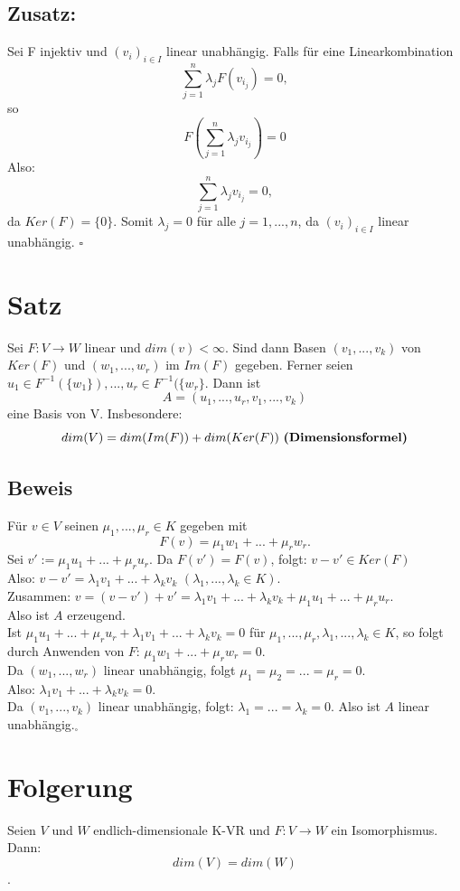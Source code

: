 \documentclass{scrbook}
\begin{document}
\subsection*{Zusatz:} Sei F injektiv und $(v_i)_{i\in I}$ linear unabhängig. Falls für eine Linearkombination \[\sum^n_{j=1} \lambda_j F(v_{i_j})=0,\] so \[F(\sum^n_{j=1} \lambda_j v_{i_j}) =0\] Also: \[\sum^n_{j=1}\lambda_j v_{i_j} = 0,\] da $Ker(F) = \{0\}$. Somit $\lambda_j=0$ für alle $j=1,...,n$, da $(v_i)_{i\in I}$ linear unabhängig. $\square$
\section{Satz} Sei $F:V\rightarrow W$ linear und $dim(v) < \infty$. Sind dann Basen $(v_1,...,v_k)$ von $Ker(F)$ und $(w_1,...,w_r)$ im $Im(F)$ gegeben. Ferner seien $u_1 \in F^{-1}(\{w_1\}),...,u_r\in F^{-1}(\{w_r\}$. Dann ist\[A = (u_1,...,u_r,v_1,...,v_k)\] eine Basis von V. Insbesondere:\[ dim(V) = dim(Im(F))+dim(Ker(F)) \text{ \textbf{(Dimensionsformel)}}\]
\subsection*{Beweis} Für $v \in V$ seinen $\mu_1,...,\mu_r\in K$ gegeben mit\[F(v)=\mu_1 w_1+...+ \mu_r w_r.\] Sei $v' := \mu_1 u_1 +...+ \mu_r u_r$. Da $F(v') = F(v)$, folgt: $v-v' \in Ker(F)$\\Also: $v-v' = \lambda_1v_1+...+\lambda_kv_k $ $(\lambda_1,...,\lambda_k \in K)$.\\Zusammen: $v=(v-v')+v' = \lambda_1v_1+...+\lambda_kv_k+\mu_1u_1+...+\mu_ru_r$.\\Also ist $A$ erzeugend.\\
Ist $\mu_1u_1+...+\mu_ru_r+\lambda_1v_1+...+\lambda_kv_k = 0$ für $\mu_1,...,\mu_r,\lambda_1,...,\lambda_k \in K$, so folgt durch Anwenden von $F$: $\mu_1w_1+...+\mu_rw_r =0$.\\ Da $(w_1,...,w_r)$ linear unabhängig, folgt $\mu_1=\mu_2=...=\mu_r = 0$.\\Also: $\lambda_1v_1+...+\lambda_kv_k=0$.\\Da $(v_1,...,v_k)$ linear unabhängig, folgt: $\lambda_1=...=\lambda_k=0$. Also ist $A$ linear unabhängig.$_\square$
\section{Folgerung}
Seien $V$ und $W$ endlich-dimensionale K-VR und $F:V\rightarrow W$ ein Isomorphismus. Dann: \[dim(V) = dim(W)\].
\end{document}

